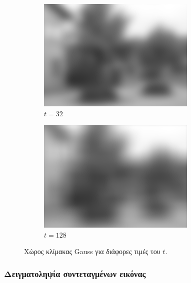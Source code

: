 \documentclass[a4paper,12pt]{article}
\begin{document}
\begin{figure}[h]
    \begin{subfigure}[b]{0.4\linewidth}
    \includegraphics[width=\linewidth]{Scalespace4.png}
    \caption{$t=32$}
    \end{subfigure}
    \begin{subfigure}[b]{0.4\linewidth}
    \includegraphics[width=\linewidth]{Scalespace5.png}
    \caption{$t=128$}
    \end{subfigure}

    \caption{Χώρος κλίμακας Gauss για διάφορες τιμές του $t$.}
    \label{fig:tGauss}
\end{figure}

\subsubsection{Δειγματοληψία συντεταγμένων εικόνας}
\end{document}
